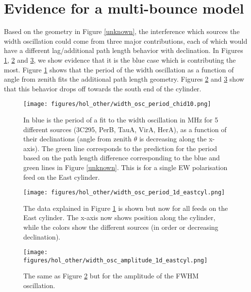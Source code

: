 \section{Evidence for a multi-bounce model}

Based on the geometry in Figure \ref{unknown}, the interference which sources the width oscillation could come from three major contributions, each of which would have a different lag/additional path length behavior with declination. In Figures \ref{feed10}, \ref{widthoscfit} and \ref{amposcfit}, we show evidence that it is the blue case which is contributing the most. Figure \ref{feed10} shows that the period of the width oscillation as a function of angle from zenith fits the additional path length geometry. Figures \ref{widthoscfit} and \ref{amposcfit} show that this behavior drops off towards the south end of the cylinder.
\begin{figure}[h!]
\begin{center}
\texttt{[image: figures/hol\_other/width\_osc\_period\_chid10.png]}
\caption{In blue is the period of a fit to the width oscillation in MHz for 5 different sources (3C295, PerB, TauA, VirA, HerA), as a function of their declinations (angle from zenith $\theta$ is decreasing along the x-axis). The green line corresponds to the prediction for the period based on the path length difference corresponding to the blue and green lines in Figure \ref{unknown}. This is for a single EW polarisation feed on the East cylinder.}
\label{feed10}
\end{center}
\end{figure}

\begin{figure}[h!]
\begin{center}
\texttt{[image: figures/hol\_other/width\_osc\_period\_1d\_eastcyl.png]}
\caption{The data explained in Figure \ref{feed10} is shown but now for all feeds on the East cylinder. The x-axis now shows position along the cylinder, while the colors show the different sources (in order or decreasing declination).}
\label{widthoscfit}
\end{center}
\end{figure}

\begin{figure}[h!]
\begin{center}
\texttt{[image: figures/hol\_other/width\_osc\_amplitude\_1d\_eastcyl.png]}
\caption{The same as Figure \ref{widthoscfit} but for the amplitude of the FWHM oscillation.}
\label{amposcfit}
\end{center}
\end{figure}

